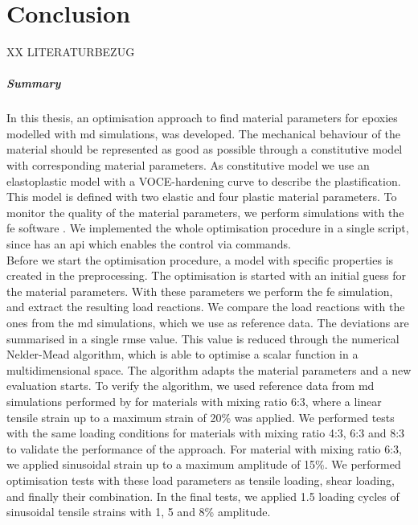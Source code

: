 \chapter{Conclusion}


XX LITERATURBEZUG

\paragraph{Summary}
In this thesis, an optimisation approach to find material parameters for epoxies modelled with \acrshort{md} simulations, was developed. The mechanical behaviour of the material should be represented as good as possible through a constitutive model with corresponding material parameters. As constitutive model we use an elastoplastic model with a VOCE-hardening curve to describe the plastification. This model is defined with two elastic and four plastic material parameters. To monitor the quality of the material parameters, we perform simulations with the \acrshort{fe} software . We implemented the whole optimisation procedure in a single  script, since  has an \acrlong{api} which enables the control via  commands. \\
Before we start the optimisation procedure, a model with specific properties is created in the preprocessing. The optimisation is started with an initial guess for the material parameters. With these parameters we perform the \acrshort{fe} simulation, and extract the resulting load reactions.
We compare the load reactions with the ones from the \acrshort{md} simulations, which we use as reference data.
The deviations are summarised in a single \acrshort{rmse} value.
This value is reduced through the numerical Nelder-Mead algorithm, which is able to optimise a scalar function in a multidimensional space. 
The algorithm adapts the material parameters and a new evaluation starts. 
To verify the algorithm, we used reference data from \acrshort{md} simulations performed by \citet{ries_deciphering_nodate} for materials with mixing ratio 6:3, where a linear tensile strain up to a maximum strain of 20\% was applied.
We performed tests with the same loading conditions for materials with mixing ratio 4:3, 6:3 and 8:3 to validate the performance of the approach. 
For material with mixing ratio 6:3, we applied sinusoidal strain up to a maximum amplitude of 15\%. 
We performed optimisation tests with these load parameters as tensile loading, shear loading, and finally their combination. 
In the final tests, we applied 1.5 loading cycles of sinusoidal tensile strains with 1, 5 and 8\% amplitude.

